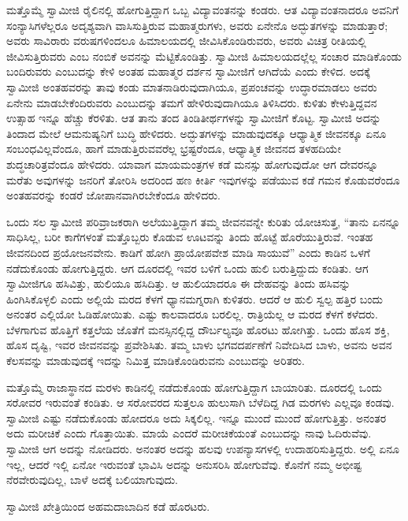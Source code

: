  ಮತ್ತೊಮ್ಮೆ ಸ್ವಾಮೀಜಿ ರೈಲಿನಲ್ಲಿ ಹೋಗುತ್ತಿದ್ದಾಗ ಒಬ್ಬ ವಿದ್ಯಾವಂತನನ್ನು ಕಂಡರು. ಆತ ವಿದ್ಯಾವಂತನಾದರೂ ಅವನಿಗೆ ಸಂನ್ಯಾಸಿಗಳೆಲ್ಲರೂ ಅದೃಶ್ಯವಾಗಿ ವಾಸಿಸುತ್ತಿರುವ ಮಹಾತ್ಮರುಗಳು, ಅವರು ಏನೇನೊ ಅದ್ಭುತಗಳನ್ನು ಮಾಡುತ್ತಾರೆ; ಅವರು ಸಾವಿರಾರು ವರುಷಗಳಿಂದಲೂ ಹಿಮಾಲಯದಲ್ಲಿ ಜೀವಿಸಿಕೊಂಡಿರುವರು, ಅವರು ವಿಚಿತ್ರ ರೀತಿಯಲ್ಲಿ ಜೀವಿಸುತ್ತಿರುವರು ಎಂಬ ನಂಬಿಕೆ ಅವನನ್ನು ಮೆಟ್ಟಿಕೊಂಡಿತ್ತು. ಸ್ವಾಮೀಜಿ ಹಿಮಾಲಯದಲ್ಲೆಲ್ಲ ಸಂಚಾರ ಮಾಡಿಕೊಂಡು ಬಂದಿರುವರು ಎಂಬುದನ್ನು ಕೇಳಿ ಅಂತಹ ಮಹಾತ್ಮರ ದರ್ಶನ ಸ್ವಾಮೀಜಿಗೆ ಆಗಿದೆಯೆ ಎಂದು ಕೇಳಿದ. ಅದಕ್ಕೆ ಸ್ವಾಮೀಜಿ ಅಂತಹವರನ್ನು ತಾವು ಕಂಡು ಮಾತನಾಡಿರುವುದಾಗಿಯೂ, ಪ್ರಪಂಚವನ್ನು ಉದ್ಧಾರಮಾಡಲು ಅವರು ಏನೇನು ಮಾಡಬೇಕೆಂದಿರುವರು ಎಂಬುದನ್ನು ತಮಗೆ ಹೇಳಿರುವುದಾಗಿಯೂ ತಿಳಿಸಿದರು. ಕುಳಿತು ಕೇಳುತ್ತಿದ್ದವನ ಉತ್ಸಾಹ ಇನ್ನೂ ಹೆಚ್ಚು ಕೆರಳಿತು. ಆತ ತಾನು ತಂದ ತಿಂಡಿತೀರ್ಥಗಳನ್ನು ಸ್ವಾಮೀಜಿಗೆ ಕೊಟ್ಟ. ಸ್ವಾಮೀಜಿ ಅದನ್ನು ತಿಂದಾದ ಮೇಲೆ ಆ\break ಮನುಷ್ಯನಿಗೆ ಬುದ್ಧಿ ಹೇಳಿದರು. ಅದ್ಭುತಗಳನ್ನು ಮಾಡುವುದಕ್ಕೂ ಆಧ್ಯಾತ್ಮಿಕ ಜೀವನಕ್ಕೂ ಏನೂ ಸಂಬಂಧವಿಲ್ಲವೆಂದೂ, ಹಾಗೆ ಮಾಡುತ್ತಿರುವವರೆಲ್ಲ ಭ್ರಷ್ಟರೆಂದೂ, ಆಧ್ಯಾತ್ಮಿಕ ಜೀವನದ ತಳಹದಿಯೇ ಶುದ್ಧಚಾರಿತ್ರವೆಂದೂ ಹೇಳಿದರು. ಯಾವಾಗ ಮಾಯಮಂತ್ರಗಳ ಕಡೆ ಮನಸ್ಸು ಹೋಗುವುದೋ ಆಗ ದೇವರನ್ನೂ ಮರೆತು ಅವುಗಳನ್ನು ಜನರಿಗೆ ತೋರಿಸಿ ಅದರಿಂದ ಹಣ ಕೀರ್ತಿ ಇವುಗಳನ್ನು ಪಡೆಯುವ ಕಡೆ ಗಮನ ಕೊಡುವರೆಂದೂ ಅಂತಹವರನ್ನು ಕಂಡರೆ ಜೋಪಾನವಾಗಿರಬೇಕೆಂದೂ ಹೇಳಿದರು. 

 ಒಂದು ಸಲ ಸ್ವಾಮೀಜಿ ಪರಿವ್ರಾಜಕರಾಗಿ ಅಲೆಯುತ್ತಿದ್ದಾಗ ತಮ್ಮ ಜೀವನವನ್ನೇ ಕುರಿತು ಯೋಚಿಸುತ್ತ, “ತಾನು ಏನನ್ನೂ ಸಾಧಿಸಿಲ್ಲ, ಬರೀ ಕಾಗೆಗಳಂತೆ ಮತ್ತೊಬ್ಬರು ಕೊಡುವ ಊಟವನ್ನು ತಿಂದು ಹೊಟ್ಟೆ ಹೊರೆಯುತ್ತಿರುವೆ. ಇಂತಹ ಜೀವನದಿಂದ ಪ್ರಯೋಜನವೇನು. ಕಾಡಿಗೆ ಹೋಗಿ ಪ್ರಾಯೋಪವೇಶ ಮಾಡಿ ಸಾಯುವೆ” ಎಂದು ಕಾಡಿನ ಒಳಗೆ ನಡೆದುಕೊಂಡು ಹೋಗುತ್ತಿದ್ದರು. ಆಗ ದೂರದಲ್ಲಿ ಇವರ ಬಳಿಗೆ ಒಂದು ಹುಲಿ ಬರುತ್ತಿದ್ದುದು ಕಂಡಿತು. ಆಗ ಸ್ವಾಮೀಜಿಗೂ ಹಸಿವಿತ್ತು, ಹುಲಿಯೂ ಹಸಿದಿತ್ತು. ಆ ಹುಲಿಯಾದರೂ ಈ ದೇಹವನ್ನು ತಿಂದು ಹಸಿವನ್ನು ಹಿಂಗಿಸಿಕೊಳ್ಳಲಿ ಎಂದು ಅಲ್ಲಿಯೆ ಮರದ ಕೆಳಗೆ ಧ್ಯಾನಮಗ್ನರಾಗಿ ಕುಳಿತರು. ಆದರೆ ಆ ಹುಲಿ ಸ್ವಲ್ಪ ಹತ್ತಿರ ಬಂದು ಅನಂತರ ಎಲ್ಲಿಯೋ ಓಡಿಹೋಯಿತು. ಎಷ್ಟು ಕಾಲವಾದರೂ ಬರಲಿಲ್ಲ. ರಾತ್ರಿಯೆಲ್ಲ ಆ ಮರದ ಕೆಳಗೆ ಕಳೆದರು. ಬೆಳಗಾಗುವ ಹೊತ್ತಿಗೆ ಕತ್ತಲೆಯ ಜೊತೆಗೆ ಮನಸ್ಸಿನಲ್ಲಿದ್ದ ದೌರ್ಬಲ್ಯವೂ ಹೊರಟು ಹೋಗಿತ್ತು. ಒಂದು ಹೊಸ ಶಕ್ತಿ, ಹೊಸ ದೃಷ್ಟಿ, ಇವರ ಜೀವನವನ್ನು ಪ್ರವೇಶಿಸಿತು. ತಮ್ಮ ಬಾಳು ಭಗವದರ್ಪಣೆಗೆ ನಿವೇದಿಸಿದ ಬಾಳು, ಅವನು ಅವನ ಕೆಲಸವನ್ನು ಮಾಡುವುದಕ್ಕೆ ಇದನ್ನು ನಿಮಿತ್ತ ಮಾಡಿಕೊಂಡಿರುವನು ಎಂಬುದನ್ನು ಅರಿತರು. 

 ಮತ್ತೊಮ್ಮೆ ರಾಜಾಸ್ಥಾನದ ಮರಳು ಕಾಡಿನಲ್ಲಿ ನಡೆದುಕೊಂಡು ಹೋಗುತ್ತಿದ್ದಾಗ ಬಾಯಾರಿತು. ದೂರದಲ್ಲಿ ಒಂದು ಸರೋವರ ಇರುವಂತೆ ಕಂಡಿತು. ಆ ಸರೋವರದ ಸುತ್ತಲೂ ಹುಲುಸಾಗಿ ಬೆಳೆದಿದ್ದ ಗಿಡ ಮರಗಳು ಎಲ್ಲವೂ ಕಂಡವು. ಸ್ವಾಮೀಜಿ ಎಷ್ಟು ನಡೆದುಕೊಂಡು ಹೋದರೂ ಅದು ಸಿಕ್ಕಲಿಲ್ಲ. ಇನ್ನೂ ಮುಂದೆ ಮುಂದೆ ಹೋಗುತ್ತಿತ್ತು. ಅನಂತರ ಅದು ಮರೀಚಿಕೆ ಎಂದು ಗೊತ್ತಾಯಿತು. ಮಾಯೆ ಎಂದರೆ ಮರೀಚಿಕೆಯಂತೆ ಎಂಬುದನ್ನು ನಾವು ಓದಿರುವೆವು. ಸ್ವಾಮೀಜಿ ಆಗ ಅದನ್ನು ನೋಡಿದರು. ಅನಂತರ ಅದನ್ನು ಹಲವು ಉಪನ್ಯಾಸಗಳಲ್ಲಿ ಉದಾಹರಿಸುತ್ತಿದ್ದರು. ಅಲ್ಲಿ ಏನೂ ಇಲ್ಲ, ಆದರೆ ಇಲ್ಲಿ ಏನೋ ಇರುವಂತೆ ಭಾವಿಸಿ ಅದನ್ನು ಅನುಸರಿಸಿ ಹೋಗುವೆವು. ಕೊನೆಗೆ ನಮ್ಮ ಅಭೀಷ್ಟ ನೆರವೇರುವುದಿಲ್ಲ, ಬಾಳೆ ಅದಕ್ಕೆ ಬಲಿಯಾಗುವುದು. 

 ಸ್ವಾಮೀಜಿ ಖೇತ್ರಿಯಿಂದ ಅಹಮದಾಬಾದಿನ ಕಡೆ ಹೊರಟರು. 


